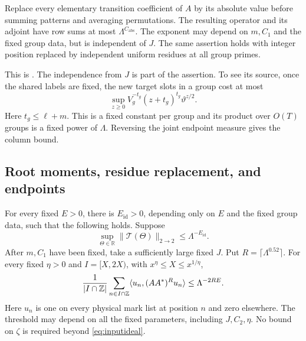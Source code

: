 \begin{proposition}\label{prop:graphabsolute}
Replace every elementary transition coefficient of \(A\) by its
absolute value before summing patterns and averaging permutations.
The resulting operator and its adjoint have row sums at most
\(\Lambda^{C_{\mathrm{abs}}}\). The exponent may depend on \(m,C_1\)
and the fixed group data, but is independent of \(J\).
The same assertion holds with integer position replaced by independent
uniform residues at all group primes.
\end{proposition}

This is \cite[Lemma 3.4]{weightedgraphs}. The independence from \(J\)
is part of the assertion. To see its source, once the shared labels
are fixed, the new target slots in a group cost at most
\[
       \sup_{z\ge0}V_g^{-t_g}(z+t_g)^{t_g}\vartheta^{z/2}.
\]
Here \(t_g\le\ell+m\). This is a fixed constant per group and its
product over \(O(T)\) groups is a fixed power of \(\Lambda\).
Reversing the joint endpoint measure gives the column bound.

\subsection{Root moments, residue replacement, and endpoints}

\begin{proposition}\label{prop:rootmoment}
For every fixed \(E>0\), there is \(E_{\mathrm{id}}>0\), depending
only on \(E\) and the fixed group data, such that the following holds.
Suppose
\begin{equation}
                   \sup_{\Theta\in\mathbb R}
                        \|\mathcal T(\Theta)\|_{2\to2}
                              \le\Lambda^{-E_{\mathrm{id}}}.
                                                                    \label{eq:inputideal}
\end{equation}
After \(m,C_1\) have been fixed, take a sufficiently large fixed \(J\).
Put \(R=\lceil\Lambda^{0.52}\rceil\). For every fixed \(\eta>0\)
and \(I=[X,2X)\), with \(x^\eta\le X\le x^{1/\eta}\),
\begin{equation}
 \frac1{|I\cap\mathbb Z|}\sum_{n\in I\cap\mathbb Z}
       \langle u_n,(AA^*)^Ru_n\rangle
                         \le\Lambda^{-2RE}.                    \label{eq:inputroot}
\end{equation}
Here \(u_n\) is one on every physical mark list at position \(n\)
and zero elsewhere. The threshold may depend on all the fixed
parameters, including \(J,C_2,\eta\). No bound on \(\zeta\) is
required beyond \eqref{eq:inputideal}.
\end{proposition}

